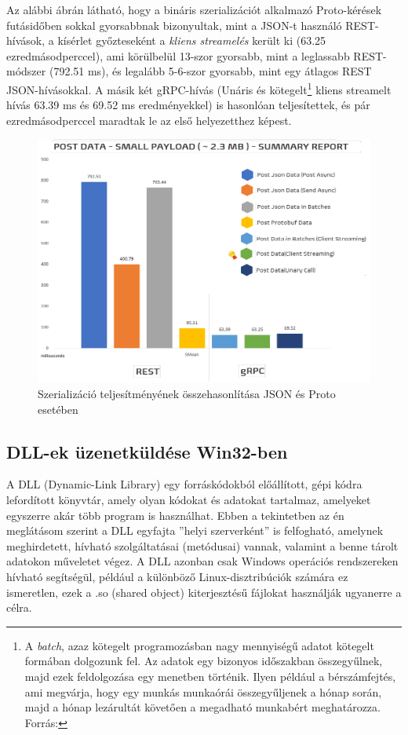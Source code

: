 \documentclass[tocnopagenum]{thesis-ekf}
\begin{document}
	\label{grpc_json}
	Az alábbi ábrán látható, hogy a bináris szerializációt alkalmazó Proto-kérések futásidőben sokkal gyorsabbnak bizonyultak, mint a JSON-t használó REST-hívások, a kísérlet győzteseként a \textit{kliens streamelés} került ki (63.25 ezredmásodperccel), ami körülbelül 13-szor gyorsabb, mint a leglassabb REST-módszer (792.51 ms), és legalább 5-6-szor gyorsabb, mint egy átlagos REST JSON-hívásokkal. A másik két gRPC-hívás (Unáris és kötegelt\footnote{A \textit{batch}, azaz kötegelt programozásban nagy mennyiségű adatot kötegelt formában dolgozunk fel. Az adatok egy bizonyos időszakban összegyűlnek, majd ezek feldolgozása egy menetben történik. Ilyen például a bérszámfejtés, ami megvárja, hogy egy munkás munkaórái összegyűljenek a hónap során, majd a hónap lezárultát követően a megadható munkabért meghatározza. Forrás:\cite{batch}} kliens streamelt hívás 63.39 ms és 69.52 ms eredményekkel) is hasonlóan teljesítettek, és pár ezredmásodperccel maradtak le az első helyezetthez képest.
	\cite{grpc_performance}
	\begin{figure}[H]
		\centering
		\includegraphics[scale=0.2]{grpc_json}
		\caption{Szerializáció teljesítményének összehasonlítása JSON és Proto esetében}
		\label{fig:grpc_json}
	\end{figure}

	\subsection{DLL-ek üzenetküldése Win32-ben}
	A DLL (Dynamic-Link Library) egy forráskódokból előállított, gépi kódra lefordított könyvtár, amely olyan kódokat és adatokat tartalmaz, amelyeket egyszerre akár több program is használhat. Ebben a tekintetben az én meglátásom szerint a DLL egyfajta ''helyi szerverként'' is felfogható, amelynek meghirdetett, hívható szolgáltatásai (metódusai) vannak, valamint a benne tárolt adatokon műveletet végez. A DLL azonban csak Windows operációs rendszereken hívható segítségül, például a különböző Linux-disztribúciók számára ez ismeretlen, ezek a .so (shared object) kiterjesztésű fájlokat használják ugyanerre a célra.
	
\end{document}
